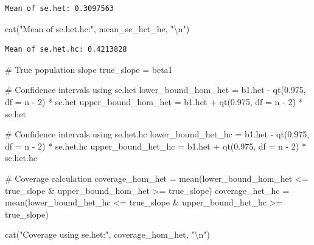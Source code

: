 \documentclass[
  11pt,
]{article}
\newenvironment{Shaded}{\begin{snugshade}}{\end{snugshade}}
\newcommand{\AttributeTok}[1]{\textcolor[rgb]{0.40,0.45,0.13}{#1}}
\newcommand{\CommentTok}[1]{\textcolor[rgb]{0.37,0.37,0.37}{#1}}
\newcommand{\DecValTok}[1]{\textcolor[rgb]{0.68,0.00,0.00}{#1}}
\newcommand{\FloatTok}[1]{\textcolor[rgb]{0.68,0.00,0.00}{#1}}
\newcommand{\FunctionTok}[1]{\textcolor[rgb]{0.28,0.35,0.67}{#1}}
\newcommand{\NormalTok}[1]{\textcolor[rgb]{0.00,0.23,0.31}{#1}}
\newcommand{\OtherTok}[1]{\textcolor[rgb]{0.00,0.23,0.31}{#1}}
\newcommand{\SpecialCharTok}[1]{\textcolor[rgb]{0.37,0.37,0.37}{#1}}
\newcommand{\StringTok}[1]{\textcolor[rgb]{0.13,0.47,0.30}{#1}}
\begin{document}
\begin{verbatim}
Mean of se.het: 0.3097563 
\end{verbatim}

\begin{Shaded}
\begin{Highlighting}[]
\FunctionTok{cat}\NormalTok{(}\StringTok{"Mean of se.het.hc:"}\NormalTok{, mean\_se\_het\_hc, }\StringTok{"}\SpecialCharTok{\textbackslash{}n}\StringTok{"}\NormalTok{)}
\end{Highlighting}
\end{Shaded}

\begin{verbatim}
Mean of se.het.hc: 0.4213828 
\end{verbatim}

\begin{Shaded}
\begin{Highlighting}[]
\CommentTok{\# True population slope }
\NormalTok{true\_slope }\OtherTok{=}\NormalTok{ beta1}

\CommentTok{\# Confidence intervals using se.het}
\NormalTok{lower\_bound\_hom\_het }\OtherTok{=}\NormalTok{ b1.het }\SpecialCharTok{{-}} \FunctionTok{qt}\NormalTok{(}\FloatTok{0.975}\NormalTok{, }\AttributeTok{df =}\NormalTok{ n }\SpecialCharTok{{-}} \DecValTok{2}\NormalTok{) }\SpecialCharTok{*}\NormalTok{ se.het}
\NormalTok{upper\_bound\_hom\_het }\OtherTok{=}\NormalTok{ b1.het }\SpecialCharTok{+} \FunctionTok{qt}\NormalTok{(}\FloatTok{0.975}\NormalTok{, }\AttributeTok{df =}\NormalTok{ n }\SpecialCharTok{{-}} \DecValTok{2}\NormalTok{) }\SpecialCharTok{*}\NormalTok{ se.het}

\CommentTok{\# Confidence intervals using se.het.hc}
\NormalTok{lower\_bound\_het\_hc }\OtherTok{=}\NormalTok{ b1.het }\SpecialCharTok{{-}} \FunctionTok{qt}\NormalTok{(}\FloatTok{0.975}\NormalTok{, }\AttributeTok{df =}\NormalTok{ n }\SpecialCharTok{{-}} \DecValTok{2}\NormalTok{) }\SpecialCharTok{*}\NormalTok{ se.het.hc}
\NormalTok{upper\_bound\_het\_hc }\OtherTok{=}\NormalTok{ b1.het }\SpecialCharTok{+} \FunctionTok{qt}\NormalTok{(}\FloatTok{0.975}\NormalTok{, }\AttributeTok{df =}\NormalTok{ n }\SpecialCharTok{{-}} \DecValTok{2}\NormalTok{) }\SpecialCharTok{*}\NormalTok{ se.het.hc}

\CommentTok{\# Coverage calculation}
\NormalTok{coverage\_hom\_het }\OtherTok{=} \FunctionTok{mean}\NormalTok{(lower\_bound\_hom\_het }\SpecialCharTok{\textless{}=}\NormalTok{ true\_slope }\SpecialCharTok{\&} 
\NormalTok{                          upper\_bound\_hom\_het }\SpecialCharTok{\textgreater{}=}\NormalTok{ true\_slope)}
\NormalTok{coverage\_het\_hc }\OtherTok{=} \FunctionTok{mean}\NormalTok{(lower\_bound\_het\_hc }\SpecialCharTok{\textless{}=}\NormalTok{ true\_slope }\SpecialCharTok{\&} 
\NormalTok{                         upper\_bound\_het\_hc }\SpecialCharTok{\textgreater{}=}\NormalTok{ true\_slope)}

\FunctionTok{cat}\NormalTok{(}\StringTok{"Coverage using se.het:"}\NormalTok{, coverage\_hom\_het, }\StringTok{"}\SpecialCharTok{\textbackslash{}n}\StringTok{"}\NormalTok{)}
\end{Highlighting}
\end{Shaded}
\end{document}
